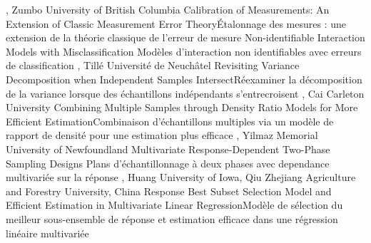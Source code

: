 {
,  {Zumbo}
{University of British Columbia}
}
{Calibration of Measurements: An Extension of Classic Measurement Error Theory}{Étalonnage des mesures : une extension de la théorie classique de l’erreur de mesure}
{\bubbleE \enspace \screenE}
{
}
{Non-identifiable Interaction Models with Misclassification }{Modèles d’interaction non identifiables avec erreurs de classification}
{\bubbleE \enspace \screenE}
{
,  {Tillé}
{Université de Neuchâtel}
}
{Revisiting Variance Decomposition when Independent Samples Intersect}{Réexaminer la décomposition de la variance lorsque des échantillons indépendants s’entrecroisent}
{\bubbleE \enspace \screenE}
{
,  {Cai}
{Carleton University}
}
{Combining Multiple Samples through Density Ratio Models for More Efficient Estimation}{Combinaison d’échantillons multiples via un modèle de rapport de densité pour une estimation plus efficace}
{\bubbleE \enspace \screenE}
{
,  {Yilmaz}
{Memorial University of Newfoundland}
}
{Multivariate Response-Dependent Two-Phase Sampling Designs }{Plans d'échantillonnage à deux phases avec dependance multivariée sur la réponse }
{\bubbleE \enspace \screenE}
{
,  {Huang}
{University of Iowa},  {Qiu}
{Zhejiang Agriculture and Forestry University, China}
}
{Response Best Subset Selection Model and Efficient Estimation in Multivariate Linear Regression}{Modèle de sélection du meilleur sous-ensemble de réponse et estimation efficace dans une régression linéaire multivariée}
{\bubbleE \enspace \screenE}


